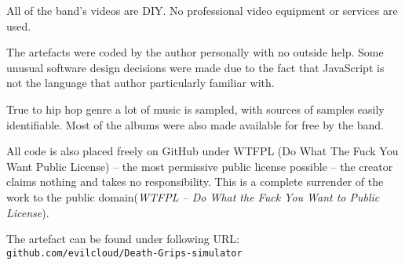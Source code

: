 \documentclass[a4paper, 11pt]{article}
\begin{document}
\begin{description}[align=right]
	\item [band]
All of the band’s videos are DIY. No professional video equipment or services are used.

	\item [artefact]
The artefacts were coded by the author personally with no outside help. Some unusual software design decisions were made due to the fact that JavaScript is not the language that author particularly familiar with.

	\item [band]
True to hip hop genre a lot of music is sampled, with sources of samples easily identifiable. Most of the albums were also made available for free by the band.

	\item [artefact]
All code is also placed freely on GitHub under WTFPL (Do What The Fuck You Want Public License) – the most permissive public license possible – the creator claims nothing and takes no responsibility. This is a complete surrender of the work to the public domain(\textit{WTFPL – Do What the Fuck You Want to Public License}).
\end{description}



\newpage

\vfill
\begin{center}
The artefact can be found under following URL:\\

\texttt{github.com/evilcloud/Death-Grips-simulator}
\end{center}
\vfill

\newpage



%
\end{document}
